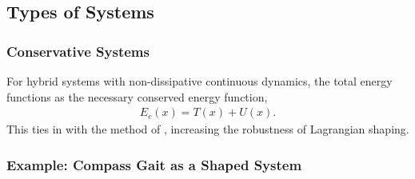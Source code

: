 \subsection{Types of Systems}
\begin{frame}
  \frametitle{Conservative Systems}
  For hybrid systems with non-dissipative continuous dynamics, the total energy functions as the necessary conserved energy function,
  \begin{align*}
    E_{c}(x) = T(x) + U(x).
  \end{align*}
  This ties in with the method of , increasing the robustness of Lagrangian shaping.
\end{frame}

\begin{frame}
  \frametitle{Example: Compass Gait as a Shaped System}


\end{frame}
